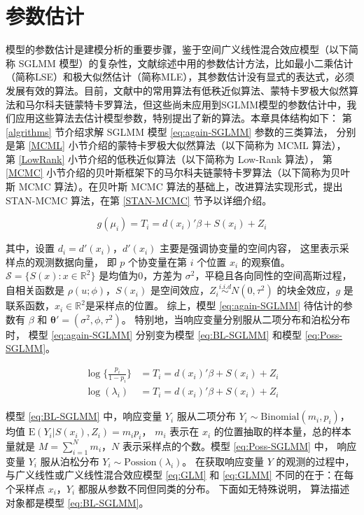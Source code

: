 \documentclass[12pt,a4paper,UTF8,twoside]{book}
\theoremstyle{definition}
\theoremstyle{definition}
\theoremstyle{definition}
\theoremstyle{remark}
\begin{document}
\hypertarget{algorithms}{%
\chapter{参数估计}\label{algorithms}}

模型的参数估计是建模分析的重要步骤，鉴于空间广义线性混合效应模型（以下简称
SGLMM
模型）的复杂性，文献综述中用的参数估计方法，比如最小二乘估计（简称LSE）和极大似然估计（简称MLE），其参数估计没有显式的表达式，必须发展有效的算法。目前，文献中的常用算法有低秩近似算法、蒙特卡罗极大似然算法和马尔科夫链蒙特卡罗算法，但这些尚未应用到SGLMM模型的参数估计中，我们应用这些算法去估计模型参数，特别提出了新的算法。本章具体结构如下：
第 \ref{algrithms} 节介绍求解 SGLMM 模型 \eqref{eq:again-SGLMM}
参数的三类算法， 分别是第 \ref{MCML}
小节介绍的蒙特卡罗极大似然算法（以下简称为 MCML 算法）， 第
\ref{LowRank} 小节介绍的低秩近似算法（以下简称为 Low-Rank 算法）， 第
\ref{MCMC}
小节介绍的贝叶斯框架下的马尔科夫链蒙特卡罗算法（以下简称为贝叶斯 MCMC
算法）。在贝叶斯 MCMC 算法的基础上，改进算法实现形式，提出 STAN-MCMC
算法，在第 \ref{STAN-MCMC} 节予以详细介绍。

\begin{equation}
g(\mu_i) =T_{i} =d(x_i)'\beta + S(x_i) + Z_i \label{eq:again-SGLMM}
\end{equation}

\noindent 其中，设置 \(d_{i} = d'(x_i)\)，\(d'(x_i)\)
主要是强调协变量的空间内容， 这里表示采样点的观测数据向量， 即 \(p\)
个协变量在第 \(i\) 个位置 \(x_i\) 的观察值。
\(\mathcal{S} = \{S(x): x \in \mathbb{R}^2\}\) 是均值为0，方差为
\(\sigma^2\)，平稳且各向同性的空间高斯过程，自相关函数是
\(\rho(u;\phi)\)，\(S(x_i)\)
是空间效应，\(Z_i \stackrel{i.i.d}{\sim} N(0,\tau^2)\) 的块金效应，\(g\)
是联系函数，\(x_i \in \mathbb{R}^2\)是采样点的位置。 综上，模型
\eqref{eq:again-SGLMM} 待估计的参数有 \(\beta\) 和
\(\boldsymbol{\theta}' = (\sigma^2,\phi,\tau^2)\)。
特别地，当响应变量分别服从二项分布和泊松分布时， 模型
\eqref{eq:again-SGLMM} 分别变为模型 \eqref{eq:BL-SGLMM} 和模型
\eqref{eq:Poss-SGLMM}。

\begin{align}
\log\{\frac{p_i}{1-p_i}\} & = T_{i} = d(x_i)'\beta + S(x_i) + Z_i  \label{eq:BL-SGLMM}\\
\log(\lambda_i)           & = T_{i} = d(x_i)'\beta + S(x_i) + Z_i  \label{eq:Poss-SGLMM}
\end{align}

\noindent 模型 \eqref{eq:BL-SGLMM} 中，响应变量 \(Y_i\) 服从二项分布
\(Y_i \sim \mathrm{Binomial}(m_i,p_i)\)， 均值
\(\mathrm{E}(Y_i|S(x_i),Z_i)=m_{i}p_{i}\)， \(m_i\) 表示在 \(x_i\)
的位置抽取的样本量，总的样本量就是 \(M=\sum_{i=1}^{N}m_i\)，\(N\)
表示采样点的个数。模型 \eqref{eq:Poss-SGLMM} 中， 响应变量 \(Y_i\)
服从泊松分布 \(Y_i \sim \mathrm{Possion}(\lambda_i)\)。 在获取响应变量
\(Y\) 的观测的过程中，与广义线性或广义线性混合效应模型 \eqref{eq:GLM} 和
\eqref{eq:GLMM} 不同的在于：在每个采样点 \(x_i\)，\(Y_i\)
都服从参数不同但同类的分布。 下面如无特殊说明， 算法描述对象都是模型
\eqref{eq:BL-SGLMM}。
\end{document}

